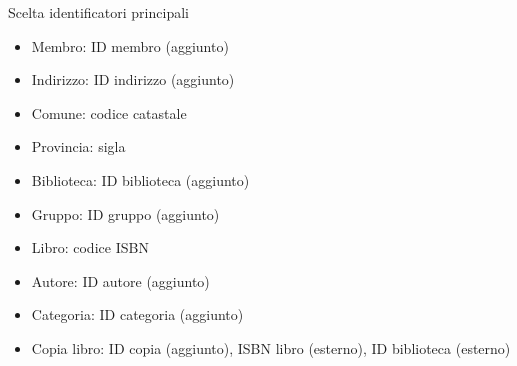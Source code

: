 \begin{frame}{Scelta identificatori principali}
    \begin{itemize}
        \item Membro: ID membro (aggiunto)
        \item Indirizzo: ID indirizzo (aggiunto)
        \item Comune: codice catastale
        \item Provincia: sigla
        \item Biblioteca: ID biblioteca (aggiunto)
        \item Gruppo: ID gruppo (aggiunto)
        \item Libro: codice ISBN
        \item Autore: ID autore (aggiunto)
        \item Categoria: ID categoria (aggiunto)
        \item Copia libro: ID copia (aggiunto), ISBN libro (esterno), ID biblioteca (esterno)
    \end{itemize}
\end{frame}

